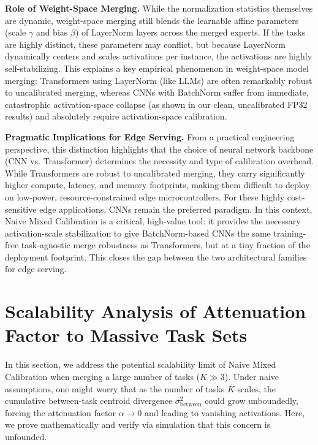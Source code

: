 \documentclass{article}
\theoremstyle{plain}
\theoremstyle{definition}
\theoremstyle{remark}
\begin{document}
\textbf{Role of Weight-Space Merging.}
While the normalization statistics themselves are dynamic, weight-space merging still blends the learnable affine parameters (scale $\gamma$ and bias $\beta$) of LayerNorm layers across the merged experts. If the tasks are highly distinct, these parameters may conflict, but because LayerNorm dynamically centers and scales activations per instance, the activations are highly self-stabilizing. This explains a key empirical phenomenon in weight-space model merging: Transformers using LayerNorm (like LLMs) are often remarkably robust to uncalibrated merging, whereas CNNs with BatchNorm suffer from immediate, catastrophic activation-space collapse (as shown in our clean, uncalibrated FP32 results) and absolutely require activation-space calibration.

\textbf{Pragmatic Implications for Edge Serving.}
From a practical engineering perspective, this distinction highlights that the choice of neural network backbone (CNN vs. Transformer) determines the necessity and type of calibration overhead. While Transformers are robust to uncalibrated merging, they carry significantly higher compute, latency, and memory footprints, making them difficult to deploy on low-power, resource-constrained edge microcontrollers. For these highly cost-sensitive edge applications, CNNs remain the preferred paradigm. In this context, Naive Mixed Calibration is a critical, high-value tool: it provides the necessary activation-scale stabilization to give BatchNorm-based CNNs the same training-free task-agnostic merge robustness as Transformers, but at a tiny fraction of the deployment footprint. This closes the gap between the two architectural families for edge serving.

\section{Scalability Analysis of Attenuation Factor to Massive Task Sets}
\label{sec:appendix_scalability}

In this section, we address the potential scalability limit of Naive Mixed Calibration when merging a large number of tasks ($K \gg 3$). Under naive assumptions, one might worry that as the number of tasks $K$ scales, the cumulative between-task centroid divergence $\sigma^2_{\text{between}}$ could grow unboundedly, forcing the attenuation factor $\alpha \to 0$ and leading to vanishing activations. Here, we prove mathematically and verify via simulation that this concern is unfounded.
\end{document}
